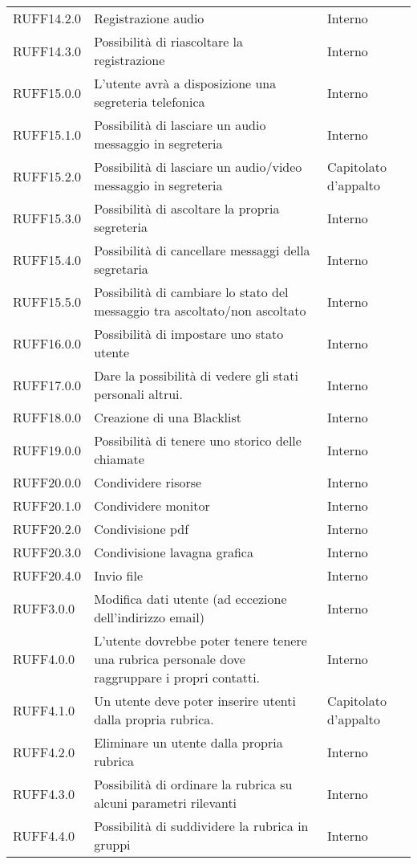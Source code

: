 \begin{longtable}{lp{}l}
RUFF14.2.0 & Registrazione audio & Interno \\
RUFF14.3.0 & Possibilità di riascoltare la registrazione & Interno \\
RUFF15.0.0 & L'utente avrà a disposizione una segreteria telefonica & Interno \\
RUFF15.1.0 & Possibilità di lasciare un audio messaggio in segreteria & Interno \\
RUFF15.2.0 & Possibilità di lasciare un audio/video messaggio in segreteria & Capitolato d'appalto \\
RUFF15.3.0 & Possibilità di ascoltare la propria segreteria & Interno \\
RUFF15.4.0 & Possibilità di cancellare messaggi della segretaria & Interno \\
RUFF15.5.0 & Possibilità di cambiare lo stato del messaggio tra ascoltato/non ascoltato & Interno \\
RUFF16.0.0 & Possibilità di impostare uno stato utente & Interno \\
RUFF17.0.0 & Dare la possibilità di vedere gli stati personali altrui. & Interno \\
RUFF18.0.0 & Creazione di una Blacklist & Interno \\
RUFF19.0.0 & Possibilità di tenere uno storico delle chiamate & Interno \\
RUFF20.0.0 & Condividere risorse & Interno \\
RUFF20.1.0 & Condividere monitor & Interno \\
RUFF20.2.0 & Condivisione pdf & Interno \\
RUFF20.3.0 & Condivisione lavagna grafica & Interno \\
RUFF20.4.0 & Invio file & Interno \\
RUFF3.0.0 & Modifica dati utente (ad eccezione dell'indirizzo email) & Interno \\
RUFF4.0.0 & L'utente dovrebbe poter tenere tenere una rubrica personale dove raggruppare i propri contatti. & Interno \\
RUFF4.1.0 & Un utente deve poter inserire utenti dalla propria rubrica. & Capitolato d'appalto \\
RUFF4.2.0 & Eliminare un utente dalla propria rubrica & Interno \\
RUFF4.3.0 & Possibilità di ordinare la rubrica su alcuni parametri rilevanti & Interno \\
RUFF4.4.0 & Possibilità di suddividere la rubrica in gruppi & Interno \\

\end{longtable}
